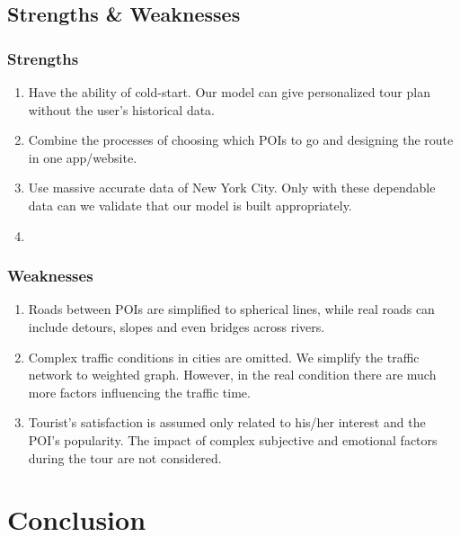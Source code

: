 \documentclass{mcmthesis}
\begin{document}
\subsection{Strengths \& Weaknesses}
\subsubsection{Strengths}
  \begin{enumerate}
    \item Have the ability of cold-start. Our model can give personalized tour plan without the user's historical data.
    \item Combine the processes of choosing which POIs to go and designing the route in one app/website.
    \item Use massive accurate data of New York City. Only with these dependable data can we validate that our model is built appropriately.
    \item 
  \end{enumerate}
\subsubsection{Weaknesses}
  \begin{enumerate}
    \item Roads between POIs are simplified to spherical lines, while real roads can include detours, slopes and even bridges across rivers.
    \item Complex traffic conditions in cities are omitted. We simplify the traffic network to weighted graph. However, in the real condition there are much more factors influencing the traffic time.
    \item Tourist's satisfaction is assumed only related to his/her interest and the POI's popularity. The impact of complex subjective and emotional factors during the tour are not considered.
  \end{enumerate}

\section{Conclusion}








\newpage
\end{document}
